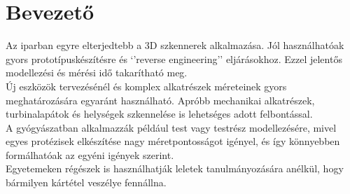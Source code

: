 \documentclass[12pt,a4paper]{article}
\begin{document}
\section{Bevezető} %
Az iparban egyre elterjedtebb a 3D szkennerek alkalmazása. Jól használhatóak gyors prototípuskészítésre és `'reverse engineering'' eljárásokhoz. Ezzel jelentős modellezési és mérési idő takarítható meg.\\[10pt]
Új eszközök tervezésénél és komplex alkatrészek méreteinek gyors meghatározására egyaránt használható. Apróbb mechanikai alkatrészek, turbinalapátok és helységek szkennelése is lehetséges adott felbontással.\\[10pt]
A gyógyászatban alkalmazzák például test vagy testrész modellezésére, mivel egyes protézisek elkészítése nagy méretpontosságot igényel, és így könnyebben formálhatóak az egyéni igények szerint.\\[10pt]
Egyetemeken régészek is használhatják leletek tanulmányozására anélkül, hogy bármilyen kártétel veszélye fennállna.\\[10pt]
\end{document}
